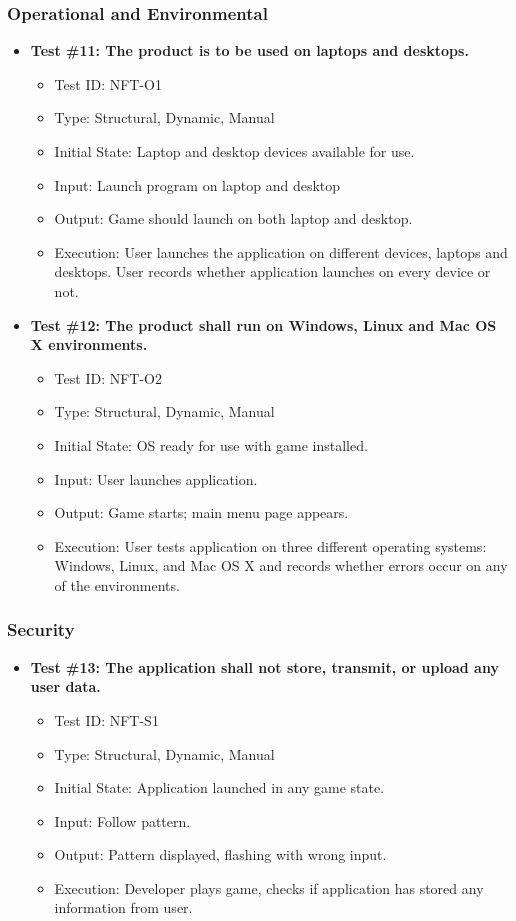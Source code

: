 \documentclass[12pt, titlepage]{article}
\begin{document}
\subsubsection{Operational and Environmental}
\begin{itemize}
\item \textbf{Test \#11: The product is to be used on laptops and desktops.}
\begin{itemize}
\item Test ID: NFT-O1
\item Type: Structural, Dynamic, Manual				
\item Initial State: Laptop and desktop devices available for use.		
\item Input: Launch program on laptop and desktop
\item Output: Game should launch on both laptop and desktop.		
\item Execution: User launches the application on different devices, laptops and desktops. User records whether application launches on every device or not.
\end{itemize}

\item \textbf{Test \#12: The product shall run on Windows, Linux and Mac OS X environments.}
\begin{itemize}
\item Test ID: NFT-O2
\item Type: Structural, Dynamic, Manual			
\item Initial State: OS ready for use with game installed.		
\item Input: User launches application.			
\item Output: Game starts; main menu page appears.				
\item Execution: User tests application on three different operating systems: Windows, Linux, and Mac OS X and records whether errors occur on any of the environments.
\end{itemize}
\end{itemize}

\subsubsection{Security}
\begin{itemize}
\item \textbf{Test \#13: The application shall not store, transmit, or upload any user data.}
\begin{itemize}
\item Test ID: NFT-S1
\item Type: Structural, Dynamic, Manual				
\item Initial State: Application launched in any game state.		
\item Input: Follow pattern.
\item Output: Pattern displayed, flashing with wrong input.		
\item Execution: Developer plays game, checks if application has stored any information from user.
\end{itemize}
\end{itemize}
\end{document}

